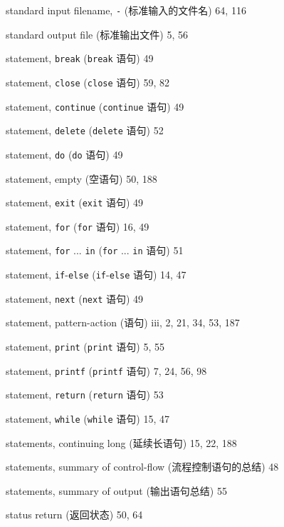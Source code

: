 \begin{multicols}{2}
\hangindent=2pc  standard input filename, \verb'-'
(标准输入的文件名) 64, 116

\hangindent=2pc  standard output file (标准输出文件) 5, 56

\hangindent=2pc  statement, \verb'break' (\verb'break' 语句) 49

\hangindent=2pc  statement, \verb'close' (\verb'close' 语句) 59, 82

\hangindent=2pc  statement, \verb'continue' (\verb'continue'
语句) 49

\hangindent=2pc  statement, \verb'delete' (\verb'delete' 语句) 52

\hangindent=2pc  statement, \verb'do' (\verb'do' 语句) 49

\hangindent=2pc  statement, empty (空语句) 50, 188

\hangindent=2pc  statement, \verb'exit' (\verb'exit' 语句) 49

\hangindent=2pc  statement, \verb'for' (\verb'for' 语句) 16, 49

\hangindent=2pc  statement, \verb'for' ... \verb'in'
(\verb'for' ... \verb'in' 语句) 51

\hangindent=2pc  statement, \verb'if'-\verb'else'
(\verb'if'-\verb'else' 语句) 14, 47

\hangindent=2pc  statement, \verb'next' (\verb'next' 语句) 49

\hangindent=2pc  statement, pattern-action (\patact 语句)
iii, 2, 21, 34, 53, 187

\hangindent=2pc  statement, \verb'print' (\verb'print' 语句) 5, 55

\hangindent=2pc  statement, \verb'printf' (\verb'printf' 语句)
7, 24, 56, 98

\hangindent=2pc  statement, \verb'return' (\verb'return' 语句) 53

\hangindent=2pc  statement, \verb'while' (\verb'while' 语句) 15, 47

\hangindent=2pc  statements, continuing long (延续长语句) 15, 22, 188

\hangindent=2pc  statements, summary of control-flow
(流程控制语句的总结) 48

\hangindent=2pc  statements, summary of output (输出语句总结) 55

\hangindent=2pc  status return (返回状态) 50, 64


\end{multicols}
